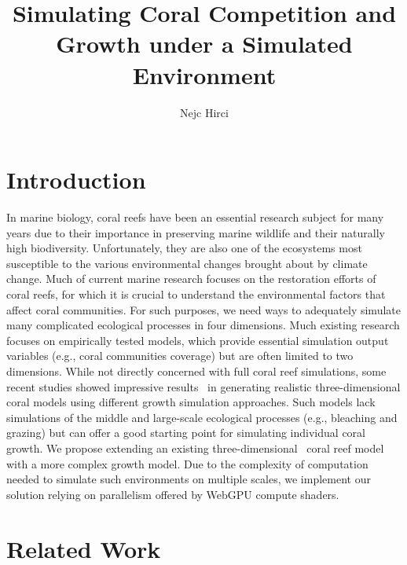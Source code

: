 \documentclass[9pt]{pnas-new}
\title{Simulating Coral Competition and Growth under a Simulated Environment}
\author{Nejc Hirci}
\affil{Collective behavior course research seminar report}
\newcommand{\eg}{e.g., }
\begin{document}
\verticaladjustment{-2pt}

\maketitle
\thispagestyle{firststyle}

\section*{Introduction}

In marine biology, coral reefs have been an essential research subject for many years due to their importance in preserving marine wildlife and their naturally high biodiversity. Unfortunately, they are also one of the ecosystems most susceptible to the various environmental changes brought about by climate change. Much of current marine research focuses on the restoration efforts of coral reefs, for which it is crucial to understand the environmental factors that affect coral communities. For such purposes, we need ways to adequately simulate many complicated ecological processes in four dimensions. Much existing research focuses on empirically tested models, which provide essential simulation output variables (\eg coral communities coverage) but are often limited to two dimensions. While not directly concerned with full coral reef simulations, some recent studies showed impressive results~\cite{sponge_growth, inifinigen} in generating realistic three-dimensional coral models using different growth simulation approaches. Such models lack simulations of the middle and large-scale ecological processes (\eg bleaching and grazing) but can offer a good starting point for simulating individual coral growth. We propose extending an existing three-dimensional~\cite{coral_community_3D} coral reef model with a more complex growth model. Due to the complexity of computation needed to simulate such environments on multiple scales, we implement our solution relying on parallelism offered by WebGPU compute shaders. 

\section*{Related Work}
\end{document}
